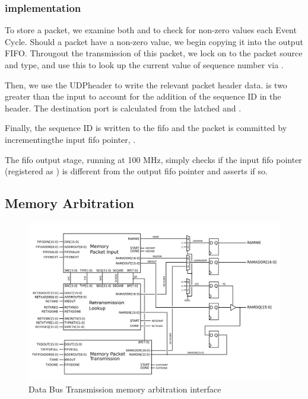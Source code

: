 \subsubsection{implementation}
To store a packet, we examine both  and
 to check for non-zero values each Event Cycle.
Should a packet have a non-zero value, we begin copying it into the
output FIFO. Througout the transmission of this packet, we lock on to
the packet source and type, and use this to look up the current value
of sequence number via  .

Then, we use the UDPheader to write the relevant packet header data.
 is two greater than the input  to
account for the addition of the sequence ID in the header. The
destination port is calculated from the latched  and
.

Finally, the sequence ID is written to the fifo and the packet is
committed by incrementingthe input fifo pointer, .

The fifo output stage, running at 100 MHz, simply checks if the input
fifo pointer (registered as ) is different from the
output fifo pointer and asserts  if so.

\subsection{Memory Arbitration}
\begin{figure}
\begin{centering}
\includegraphics[scale=0.8]{data.memarbit.svg}
\end{centering}
\caption{Data Bus Transmission memory arbitration interface}
\label{data.memarbit}
\end{figure}

